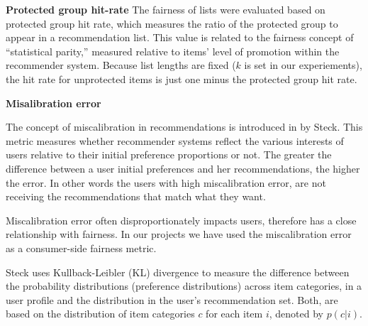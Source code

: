         \textbf{Protected group hit-rate}
        The fairness of lists were evaluated based on protected group hit rate, which measures the ratio of the protected group to appear in a recommendation list. This value is related to the fairness concept of ``statistical parity,'' measured relative to items' level of promotion within the recommender system. Because list lengths are fixed ($k$ is set in our experiements), the hit rate for unprotected items is just one minus the protected group hit rate. 
        
    
        \textbf{Misalibration error}
        
        The concept of miscalibration in recommendations is introduced in \cite{steck2018calibrated} by Steck. This metric measures whether recommender systems reflect the various interests of users relative to their initial preference proportions or not. The greater the difference between a user initial preferences and her recommendations, the higher the error. In other words the users with high miscalibration error, are not receiving the recommendations that match what they want.
        
        Miscalibration error often disproportionately impacts users, therefore has a close relationship with fairness. In our projects we have used the miscalibration error as a consumer-side fairness metric.
        
        
        Steck uses Kullback-Leibler (KL) divergence to measure the difference between the probability distributions (preference distributions) across item categories, in a user profile and the distribution in the user's recommendation set. Both, are based on the distribution of item categories $c$ for each item $i$, denoted by $p(c|i)$.
    
